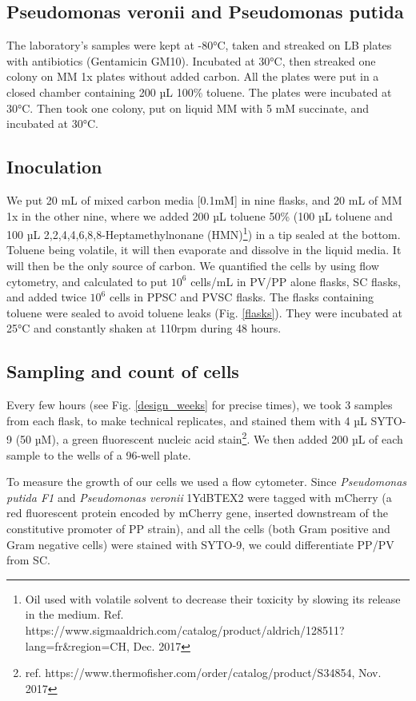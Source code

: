 \documentclass[a4paper, 10pt, conference]{ieeeconf}   %
\begin{document}
\subsection{Pseudomonas veronii and Pseudomonas putida}
The laboratory's samples were kept at -80°C, taken and streaked on LB plates with antibiotics (Gentamicin GM10). Incubated at 30°C, then streaked one colony on MM 1x plates without added carbon. All the plates were put in a closed chamber containing 200 µL 100\% toluene. The plates were incubated at 30°C. Then took one colony, put on liquid MM with 5 mM succinate, and incubated at 30°C.

\subsection{Inoculation}
We put 20 mL of mixed carbon media [0.1mM] in nine flasks, and 20 mL of MM 1x in the other nine, where we added 200 µL toluene  50\% (100 µL toluene and 100 µL 2,2,4,4,6,8,8-Heptamethylnonane (HMN)\footnote{Oil used with volatile solvent to decrease their toxicity by slowing its release in the medium. Ref. https://www.sigmaaldrich.com/catalog/product/aldrich/128511?lang\linebreak[0]=fr\&region=CH, Dec. 2017}) in a tip sealed at the bottom. Toluene being volatile, it will then evaporate and dissolve in the liquid media. It will then be the only source of carbon. We quantified the cells by using flow cytometry, and calculated to put $10^{6}$ cells/mL in PV/PP alone flasks, SC flasks, and added twice $10^{6}$ cells in PPSC and PVSC flasks. The flasks containing toluene were sealed to avoid toluene leaks (Fig. \ref{flasks}).
They were incubated at 25°C and constantly shaken at 110rpm during 48 hours.

\subsection{Sampling and count of cells}
Every few hours (see Fig. \ref{design_weeks} for precise times), we took 3 samples from each flask, to make technical replicates, and stained them with 4 µL SYTO-9 (50 µM), a  green fluorescent nucleic acid stain\footnote{ref. https://www.thermofisher.com/order/catalog/product/S34854, Nov. 2017}.  We then added 200 µL of each sample to the wells of a 96-well plate.

To measure the growth of our cells we used a flow cytometer. 
Since \textit{Pseudomonas putida F1} and \textit{Pseudomonas veronii} 1YdBTEX2 were tagged with mCherry (a red fluorescent protein encoded by mCherry gene, inserted downstream of the constitutive promoter of PP strain), and all the cells (both Gram positive and Gram negative cells) were stained with SYTO-9, we could differentiate PP/PV from SC. 
%  
\end{document}
